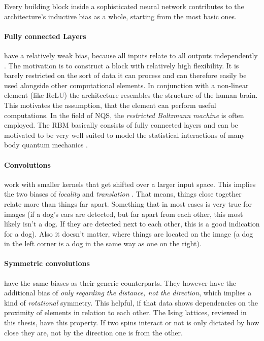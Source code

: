 Every building block inside a sophisticated neural network contributes to the architecture's inductive bias as a whole, starting from the most basic ones.

\paragraph{Fully connected Layers} have a relatively weak bias, because all inputs relate to all outputs independently \cite{relationalInductiveBiasesAndGraphNetworks}. 
The motivation is to construct a block with relatively high flexibility.
It is barely restricted on the sort of data it can process and can therefore easily be used alongside other computational elements.
In conjunction with a non-linear element (like ReLU) the architecture resembles the structure of the human brain. 
This motivates the assumption, that the element can perform useful computations.
In the field of NQS, the \emph{restricted Boltzmann machine} is often employed.
The RBM basically consists of fully connected layers and can be motivated to be very well suited to model the statistical interactions of many body quantum mechanics \cite{restrictedBoltzmanMachines}. 

\paragraph{Convolutions} work with smaller kernels that get shifted over a larger input space.
This implies the two biases of \emph{locality} and \emph{translation} \cite{relationalInductiveBiasesAndGraphNetworks}.
That means, things close together relate more than things far apart. 
Something that in most cases is very true for images (if a dog's ears are detected, but far apart from each other, this most likely isn't a dog. If they are detected next to each other, this is a good indication for a dog).
Also it doesn't matter, where things are located on the image (a dog in the left corner is a dog in the same way as one on the right).

\paragraph{Symmetric convolutions} have the same biases as their generic counterparts. They however have the additional bias of \emph{only regarding the distance, not the direction}, which implies a kind of \emph{rotational} symmetry.
This helpful, if that data shows dependencies on the proximity of elements in relation to each other. 
The Ising lattices, reviewed in this thesis, have this property. 
If two spins interact or not is only dictated by how close they are, not by the direction one is from the other.

